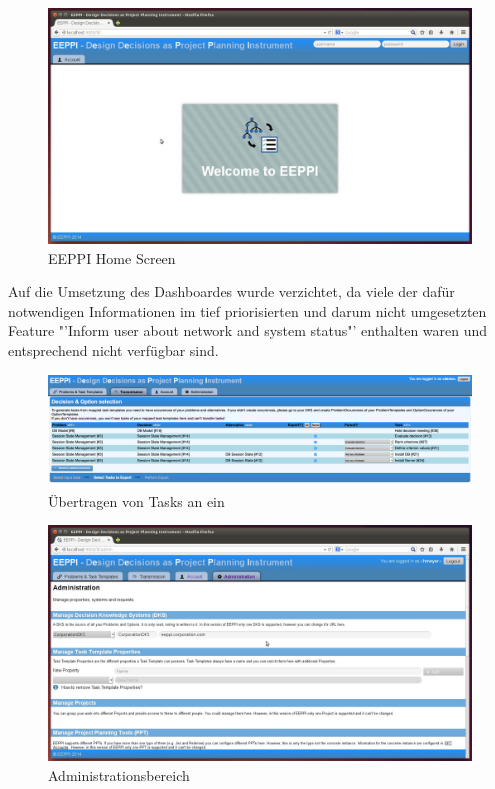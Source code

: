 		\begin{figure}[H]
			\centering
			\includegraphics[width=\linewidth]{tutorial/img/eeppiHomeScreen.jpg}
			\caption{EEPPI Home Screen}
			\label{fig:eeppiHomeScreen}
		\end{figure}	
		
		Auf die Umsetzung des Dashboardes wurde verzichtet, da viele der dafür notwendigen Informationen im tief priorisierten und darum nicht umgesetzten Feature "'Inform user about network and system status"' enthalten waren und entsprechend nicht verfügbar sind.
		
		\begin{figure}[H]
			\centering
			\includegraphics[width=\linewidth]{tutorial/img/transmit2.png}
			\caption{Übertragen von Tasks an ein \ppt}
			\label{fig:administration}
		\end{figure}	
		
		\begin{figure}[H]
			\centering
			\includegraphics[width=\linewidth]{tutorial/img/administrationDKS.jpg}
			\caption{Administrationsbereich}
			\label{fig:eeppiDecisionsAndTaskTemplates}
		\end{figure}	
		
